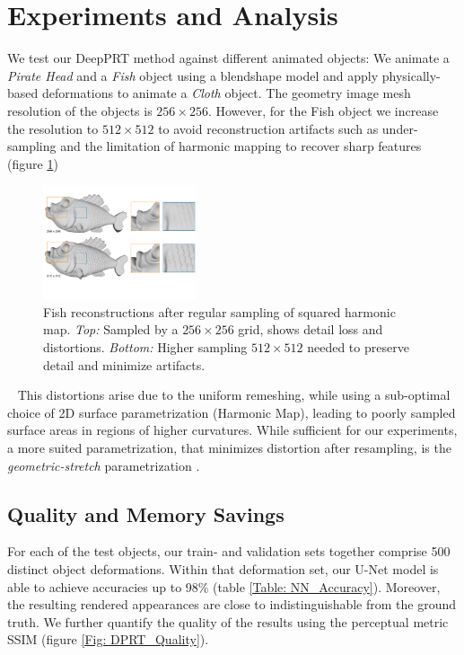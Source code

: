\section{Experiments and Analysis}  \label{Sec:Experiments}
We test our DeepPRT method against different animated objects: We animate a \textit{Pirate Head} and a \textit{Fish} object using a blendshape model and apply physically-based deformations to animate a \textit{Cloth} object.
The geometry image mesh resolution of the objects is $256 \times 256$. However, for the Fish object we increase the resolution to $512 \times 512$ to avoid reconstruction artifacts such as under-sampling and the limitation of harmonic mapping to recover sharp features (figure \ref{Fig: Fish Reconstruction})
\begin{figure}[H]
  \centering
    \includegraphics[width=0.4\textwidth]{Figures/fish}
     \caption{Fish reconstructions after regular sampling of squared harmonic map. \textit{Top:} Sampled by a $256 \times 256$ grid, shows detail loss and distortions. \textit{Bottom:} Higher sampling $512 \times 512$ needed to preserve detail and minimize artifacts.}
     \label{Fig: Fish Reconstruction}
\end{figure}~
This distortions arise due to the uniform remeshing, while using a sub-optimal choice of 2D surface parametrization (Harmonic Map), leading to poorly sampled surface areas in regions of higher curvatures. While sufficient for our experiments, a more suited parametrization, that minimizes distortion after resampling, is the \textit{geometric-stretch} parametrization \cite{gu2002geometry}. 
\subsection*{Quality and Memory Savings} \label{Sec: memory_savings}
For each of the test objects, our train- and validation sets together comprise 500 distinct object deformations. 
Within that deformation set, our U-Net model is able to achieve accuracies up to 98\% (table \ref{Table: NN_Accuracy}). Moreover, the resulting rendered appearances are close to indistinguishable from the ground truth. We further quantify the quality of the results using the perceptual metric SSIM (figure \ref{Fig: DPRT_Quality}). 

